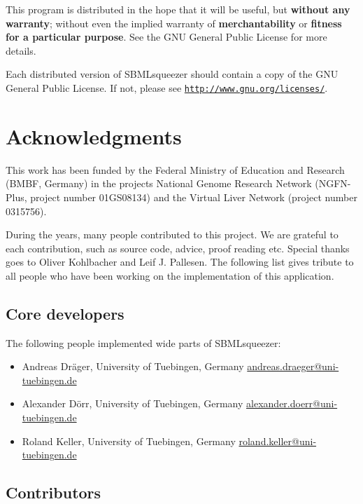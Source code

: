 This program is distributed in the hope that it will be useful,
but \textbf{without any warranty}; without even the implied warranty of
\textbf{merchantability} or \textbf{fitness for a particular purpose}. See the
GNU General Public License for more details.

Each distributed version of SBMLsqueezer should contain a copy of the 
GNU General Public License. If not, please see
\href{http://www.gnu.org/licenses/gpl-3.0-standalone.html}{\nolinkurl{http://www.gnu.org/licenses/}}.

\chapter{Acknowledgments}

This work has been funded by the Federal Ministry of Education and Research
(BMBF, Germany) in the projects National Genome Research Network (NGFN-Plus,
project number 01GS08134) and the Virtual Liver Network (project number 0315756).

During the years, many people contributed to this project.
We are grateful to each contribution, such as source code, advice, proof reading
etc. Special thanks goes to Oliver Kohlbacher and Leif J. Pallesen.
The following list gives tribute to all people who have been working on the
implementation of this application.

\section{Core developers}

The following people implemented wide parts of SBMLsqueezer:
\begin{itemize}
\item Andreas Dr\"ager, 
  University of Tuebingen, Germany
  \href{mailto:andreas.draeger@uni-tuebingen.de}{andreas.draeger@uni-tuebingen.de}
\item Alexander D\"orr, 
  University of Tuebingen, Germany
  \href{mailto:alexander.doerr@uni-tuebingen.de}{alexander.doerr@uni-tuebingen.de}
\item Roland Keller,
  University of Tuebingen, Germany
  \href{mailto:roland.keller@uni-tuebingen.de}{roland.keller@uni-tuebingen.de}
\end{itemize}

\section{Contributors}


